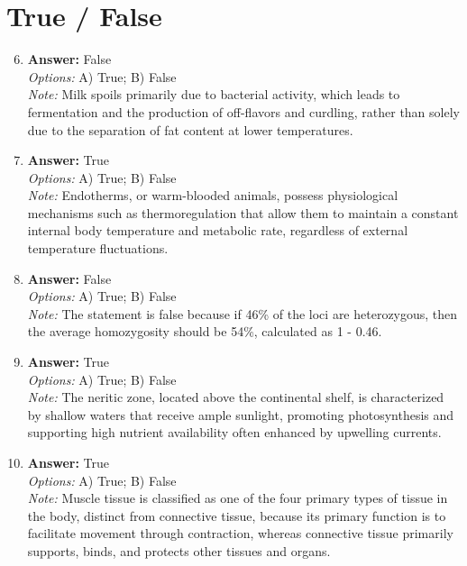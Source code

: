 \documentclass[12pt]{article}
\begin{document}
\section*{True / False}
\begin{enumerate}[label=\arabic*.]
\setcounter{enumi}{5}
\item \textbf{Answer:} False
\\ \textit{Options:} A) True; B) False
\\ \textit{Note:} Milk spoils primarily due to bacterial activity, which leads to fermentation and the production of off-flavors and curdling, rather than solely due to the separation of fat content at lower temperatures.
\item \textbf{Answer:} True
\\ \textit{Options:} A) True; B) False
\\ \textit{Note:} Endotherms, or warm-blooded animals, possess physiological mechanisms such as thermoregulation that allow them to maintain a constant internal body temperature and metabolic rate, regardless of external temperature fluctuations.
\item \textbf{Answer:} False
\\ \textit{Options:} A) True; B) False
\\ \textit{Note:} The statement is false because if 46\% of the loci are heterozygous, then the average homozygosity should be 54\%, calculated as 1 - 0.46.
\item \textbf{Answer:} True
\\ \textit{Options:} A) True; B) False
\\ \textit{Note:} The neritic zone, located above the continental shelf, is characterized by shallow waters that receive ample sunlight, promoting photosynthesis and supporting high nutrient availability often enhanced by upwelling currents.
\item \textbf{Answer:} True
\\ \textit{Options:} A) True; B) False
\\ \textit{Note:} Muscle tissue is classified as one of the four primary types of tissue in the body, distinct from connective tissue, because its primary function is to facilitate movement through contraction, whereas connective tissue primarily supports, binds, and protects other tissues and organs.
\end{enumerate}
\end{document}
